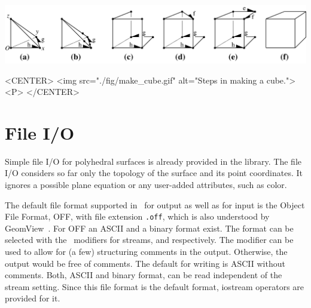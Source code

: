 \begin{ccTexOnly}
    \begin{center}
      \parbox{\textwidth}{%
          \includegraphics[width=\textwidth]{Polyhedron/fig/make_cube}%
      }
    \end{center}
\end{ccTexOnly}

\begin{ccHtmlOnly}
    <CENTER>
        <img src="./fig/make_cube.gif" alt="Steps in making a cube."><P>
    </CENTER>
\end{ccHtmlOnly}





\section{File I/O}
\label{sectionPolyIO}

Simple file I/O for polyhedral surfaces is already provided in the
library. The file I/O considers so far only the topology of the
surface and its point coordinates. It ignores a possible plane
equation or any user-added attributes, such as color.

The default file format supported in \cgal\ for output as well as for
input is the Object File Format, OFF, with file extension {\tt .off},
which is also understood by GeomView~\cite{cgal:p-gmgv16-96}. For OFF
an ASCII and a binary format exist. The format can be selected with
the \cgal\ modifiers for streams,  and
 respectively. The modifier 
can be used to allow for (a few) structuring comments in the
output. Otherwise, the output would be free of comments.  The default
for writing is ASCII without comments. Both, ASCII and binary format,
can be read independent of the stream setting. Since this file format
is the default format, iostream operators are provided for it.


